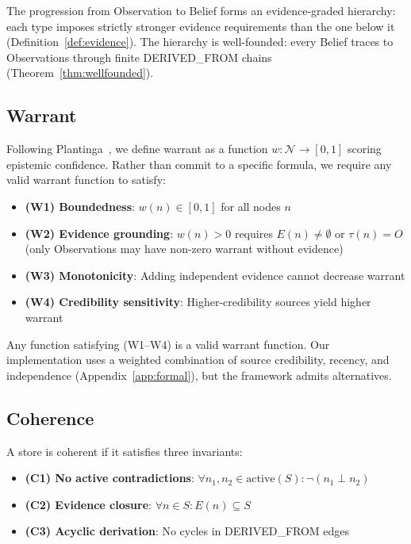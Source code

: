 \documentclass[11pt,letterpaper]{article}
\begin{document}
The progression from Observation to Belief forms an evidence-graded hierarchy: each type imposes strictly stronger evidence requirements than the one below it (Definition~\ref{def:evidence}). The hierarchy is well-founded: every Belief traces to Observations through finite DERIVED\_FROM chains (Theorem~\ref{thm:wellfounded}).

\subsection{Warrant}

Following Plantinga~\cite{plantinga1993}, we define warrant as a function $w: \mathcal{N} \to [0,1]$ scoring epistemic confidence. Rather than commit to a specific formula, we require any valid warrant function to satisfy:

\begin{itemize}[noitemsep]
    \item \textbf{(W1) Boundedness}: $w(n) \in [0,1]$ for all nodes $n$
    \item \textbf{(W2) Evidence grounding}: $w(n) > 0$ requires $E(n) \neq \emptyset$ or $\tau(n) = O$ (only Observations may have non-zero warrant without evidence)
    \item \textbf{(W3) Monotonicity}: Adding independent evidence cannot decrease warrant
    \item \textbf{(W4) Credibility sensitivity}: Higher-credibility sources yield higher warrant
\end{itemize}

Any function satisfying (W1--W4) is a valid warrant function. Our implementation uses a weighted combination of source credibility, recency, and independence (Appendix~\ref{app:formal}), but the framework admits alternatives.

\subsection{Coherence}

A store is coherent if it satisfies three invariants:

\begin{itemize}[noitemsep]
    \item \textbf{(C1) No active contradictions}: $\forall n_1, n_2 \in \text{active}(S): \neg(n_1 \perp n_2)$
    \item \textbf{(C2) Evidence closure}: $\forall n \in S: E(n) \subseteq S$
    \item \textbf{(C3) Acyclic derivation}: No cycles in DERIVED\_FROM edges
\end{itemize}
\end{document}
